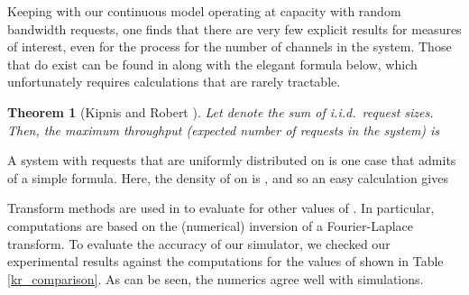 \documentclass{amsart}
\newtheorem{theorem}{Theorem}
\begin{document}
Keeping with our continuous model operating at capacity
with random bandwidth requests, one finds that
there are very few explicit results for measures of interest, even
for the process  for the number of channels in the system. Those that do
exist can be found in \cite{KipnisR1990} along with the elegant
formula below, which unfortunately requires calculations that are
rarely tractable.


\begin{theorem}[Kipnis and Robert \cite{KipnisR1990}]
Let  denote the sum of 
i.i.d.\ request sizes. Then, the maximum throughput (expected number of requests in the system) is



\end{theorem}

A system with requests that are uniformly distributed on  is one case that admits of a simple
formula. Here, the density of  on  is ,
and so an easy calculation gives

Transform methods are used in \cite{KipnisR1990} to evaluate 
for other values of . In particular, computations are based
on the (numerical) inversion of a Fourier-Laplace transform. To evaluate the
accuracy of our simulator, we checked our experimental results
against the computations  for the values of  shown in Table
\ref{kr_comparison}.  As can be seen, the numerics agree well with
simulations.
\end{document}
